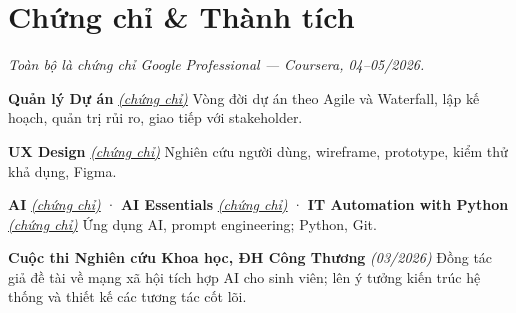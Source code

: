 \documentclass[a4paper,9pt]{extarticle}
\begin{document}
\section{Chứng chỉ \& Thành tích}
\begin{cvPlain}
  \item {\itshape Toàn bộ là chứng chỉ Google Professional — Coursera, 04--05/2026.}
  \item \textbf{Quản lý Dự án} \href{https://www.coursera.org/account/accomplishments/specialization/certificate/Y0JMYWUVVJG9}{\itshape (chứng chỉ)} \; Vòng đời dự án theo Agile và Waterfall, lập kế hoạch, quản trị rủi ro, giao tiếp với stakeholder.
  \item \textbf{UX Design} \href{https://coursera.org/verify/professional-cert/4NPVV3FRP07M}{\itshape (chứng chỉ)} \; Nghiên cứu người dùng, wireframe, prototype, kiểm thử khả dụng, Figma.
  \item \textbf{AI} \href{https://www.coursera.org/account/accomplishments/specialization/certificate/84G1CO6ABM7P}{\itshape (chứng chỉ)} · \textbf{AI Essentials} \href{https://www.coursera.org/account/accomplishments/specialization/certificate/POYFWIV2Y5VW}{\itshape (chứng chỉ)} · \textbf{IT Automation with Python} \href{https://www.coursera.org/account/accomplishments/specialization/certificate/ERRCIOPXMF5I}{\itshape (chứng chỉ)} \; Ứng dụng AI, prompt engineering; Python, Git.
  \item \textbf{Cuộc thi Nghiên cứu Khoa học, ĐH Công Thương} {\itshape (03/2026)} \; Đồng tác giả đề tài về mạng xã hội tích hợp AI cho sinh viên; lên ý tưởng kiến trúc hệ thống và thiết kế các tương tác cốt lõi.
\end{cvPlain}
\end{document}
